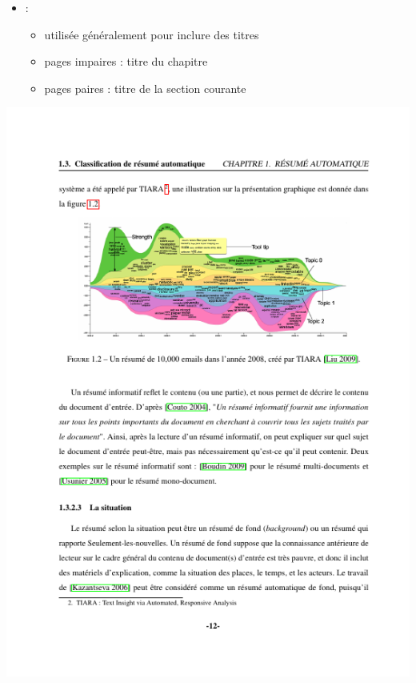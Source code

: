 \documentclass[xcolor=table]{beamer}
\begin{document}
\begin{frame}
\begin{minipage}{0.60\textwidth}
\begin{itemize}
		\item {}: 
		\begin{itemize}
			\item utilisée généralement pour inclure des titres
			\item pages impaires : titre du chapitre
			\item pages paires : titre de la section courante
		\end{itemize}
	\end{itemize}
\end{minipage}
\begin{minipage}{0.38\textwidth}
	\includegraphics[width=\textwidth,frame]{..//img/Bweb03-redaction/dev.png}
\end{minipage}

\end{frame}
\end{document}

